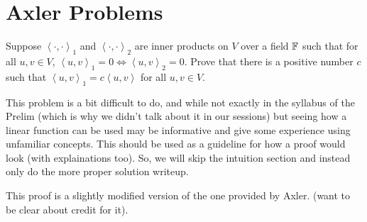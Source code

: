 \documentclass[answers]{exam}
\newcommand{\ip}[1]{\left\langle#1\right\rangle}
\begin{document}
\section{Axler Problems}
\begin{questions}
    \question Suppose $\ip{\cdot,\cdot}_1$ and $\ip{\cdot,\cdot}_2$ are inner products on $V$ over a field
    $\mathbb{F}$ such that for all 
    $u,v\in V$, $\ip{u,v}_1 = 0 \iff \ip{u,v}_2=0$. Prove that there is a positive number $c$ such that 
    $\ip{u,v}_1 = c\ip{u,v}$ for all $u,v\in V$.
    \begin{solution}


        This problem is a bit difficult to do, and while not exactly in the syllabus of the Prelim (which is 
        why we didn't talk about it in our sessions) but seeing how a linear function can be used may be 
        informative and give some experience using unfamiliar concepts. This should be used as a guideline for
        how a proof would look (with explainations too). 
        So, we will skip the intuition section and instead only do the more proper solution
        writeup.

        This proof is a slightly modified version of the one provided by Axler. (want to be clear about credit 
        for it).



\end{solution}
\end{questions}
\end{document}
